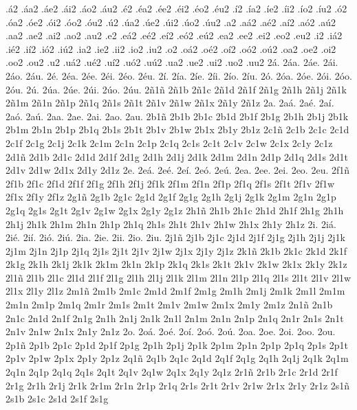 .\'a2
.\'aa2
.\'ae2
.\'ai2
.\'ao2
.\'au2
.\'e2
.\'ea2
.\'ee2
.\'ei2
.\'eo2
.\'eu2
.\'i2
.\'ia2
.\'ie2
.\'ii2
.\'io2
.\'iu2
.\'o2
.\'oa2
.\'oe2
.\'oi2
.\'oo2
.\'ou2
.\'u2
.\'ua2
.\'ue2
.\'ui2
.\'uo2
.\'uu2
.a2
.a\'a2
.a\'e2
.a\'i2
.a\'o2
.a\'u2
.aa2
.ae2
.ai2
.ao2
.au2
.e2
.e\'a2
.e\'e2
.e\'i2
.e\'o2
.e\'u2
.ea2
.ee2
.ei2
.eo2
.eu2
.i2
.i\'a2
.i\'e2
.i\'i2
.i\'o2
.i\'u2
.ia2
.ie2
.ii2
.io2
.iu2
.o2
.o\'a2
.o\'e2
.o\'i2
.o\'o2
.o\'u2
.oa2
.oe2
.oi2
.oo2
.ou2
.u2
.u\'a2
.u\'e2
.u\'i2
.u\'o2
.u\'u2
.ua2
.ue2
.ui2
.uo2
.uu2
2\'a.
2\'aa.
2\'ae.
2\'ai.
2\'ao.
2\'au.
2\'e.
2\'ea.
2\'ee.
2\'ei.
2\'eo.
2\'eu.
2\'i.
2\'ia.
2\'ie.
2\'ii.
2\'io.
2\'iu.
2\'o.
2\'oa.
2\'oe.
2\'oi.
2\'oo.
2\'ou.
2\'u.
2\'ua.
2\'ue.
2\'ui.
2\'uo.
2\'uu.
2\~n1\~n
2\~n1b
2\~n1c
2\~n1d
2\~n1f
2\~n1g
2\~n1h
2\~n1j
2\~n1k
2\~n1m
2\~n1n
2\~n1p
2\~n1q
2\~n1s
2\~n1t
2\~n1v
2\~n1w
2\~n1x
2\~n1y
2\~n1z
2a.
2a\'a.
2a\'e.
2a\'i.
2a\'o.
2a\'u.
2aa.
2ae.
2ai.
2ao.
2au.
2b1\~n
2b1b
2b1c
2b1d
2b1f
2b1g
2b1h
2b1j
2b1k
2b1m
2b1n
2b1p
2b1q
2b1s
2b1t
2b1v
2b1w
2b1x
2b1y
2b1z
2c1\~n
2c1b
2c1c
2c1d
2c1f
2c1g
2c1j
2c1k
2c1m
2c1n
2c1p
2c1q
2c1s
2c1t
2c1v
2c1w
2c1x
2c1y
2c1z
2d1\~n
2d1b
2d1c
2d1d
2d1f
2d1g
2d1h
2d1j
2d1k
2d1m
2d1n
2d1p
2d1q
2d1s
2d1t
2d1v
2d1w
2d1x
2d1y
2d1z
2e.
2e\'a.
2e\'e.
2e\'i.
2e\'o.
2e\'u.
2ea.
2ee.
2ei.
2eo.
2eu.
2f1\~n
2f1b
2f1c
2f1d
2f1f
2f1g
2f1h
2f1j
2f1k
2f1m
2f1n
2f1p
2f1q
2f1s
2f1t
2f1v
2f1w
2f1x
2f1y
2f1z
2g1\~n
2g1b
2g1c
2g1d
2g1f
2g1g
2g1h
2g1j
2g1k
2g1m
2g1n
2g1p
2g1q
2g1s
2g1t
2g1v
2g1w
2g1x
2g1y
2g1z
2h1\~n
2h1b
2h1c
2h1d
2h1f
2h1g
2h1h
2h1j
2h1k
2h1m
2h1n
2h1p
2h1q
2h1s
2h1t
2h1v
2h1w
2h1x
2h1y
2h1z
2i.
2i\'a.
2i\'e.
2i\'i.
2i\'o.
2i\'u.
2ia.
2ie.
2ii.
2io.
2iu.
2j1\~n
2j1b
2j1c
2j1d
2j1f
2j1g
2j1h
2j1j
2j1k
2j1m
2j1n
2j1p
2j1q
2j1s
2j1t
2j1v
2j1w
2j1x
2j1y
2j1z
2k1\~n
2k1b
2k1c
2k1d
2k1f
2k1g
2k1h
2k1j
2k1k
2k1m
2k1n
2k1p
2k1q
2k1s
2k1t
2k1v
2k1w
2k1x
2k1y
2k1z
2l1\~n
2l1b
2l1c
2l1d
2l1f
2l1g
2l1h
2l1j
2l1k
2l1m
2l1n
2l1p
2l1q
2l1s
2l1t
2l1v
2l1w
2l1x
2l1y
2l1z
2m1\~n
2m1b
2m1c
2m1d
2m1f
2m1g
2m1h
2m1j
2m1k
2m1l
2m1m
2m1n
2m1p
2m1q
2m1r
2m1s
2m1t
2m1v
2m1w
2m1x
2m1y
2m1z
2n1\~n
2n1b
2n1c
2n1d
2n1f
2n1g
2n1h
2n1j
2n1k
2n1l
2n1m
2n1n
2n1p
2n1q
2n1r
2n1s
2n1t
2n1v
2n1w
2n1x
2n1y
2n1z
2o.
2o\'a.
2o\'e.
2o\'i.
2o\'o.
2o\'u.
2oa.
2oe.
2oi.
2oo.
2ou.
2p1\~n
2p1b
2p1c
2p1d
2p1f
2p1g
2p1h
2p1j
2p1k
2p1m
2p1n
2p1p
2p1q
2p1s
2p1t
2p1v
2p1w
2p1x
2p1y
2p1z
2q1\~n
2q1b
2q1c
2q1d
2q1f
2q1g
2q1h
2q1j
2q1k
2q1m
2q1n
2q1p
2q1q
2q1s
2q1t
2q1v
2q1w
2q1x
2q1y
2q1z
2r1\~n
2r1b
2r1c
2r1d
2r1f
2r1g
2r1h
2r1j
2r1k
2r1m
2r1n
2r1p
2r1q
2r1s
2r1t
2r1v
2r1w
2r1x
2r1y
2r1z
2s1\~n
2s1b
2s1c
2s1d
2s1f
2s1g
